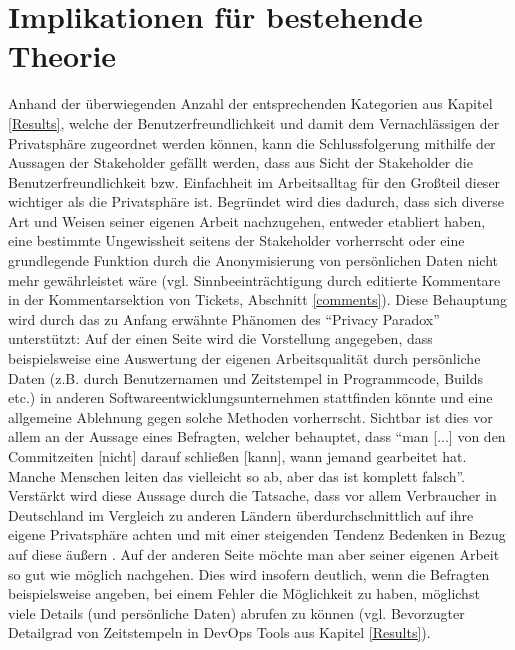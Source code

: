 \section{Implikationen für bestehende Theorie}
Anhand der überwiegenden Anzahl der entsprechenden Kategorien aus Kapitel \ref{Results}, welche der Benutzerfreundlichkeit und damit dem Vernachlässigen der
Privatsphäre zugeordnet werden können, kann die Schlussfolgerung mithilfe der Aussagen der Stakeholder gefällt werden, dass aus Sicht der Stakeholder die Benutzerfreundlichkeit bzw. Einfachheit
im Arbeitsalltag für den Großteil dieser wichtiger als die Privatsphäre ist. \newline Begründet wird dies dadurch, dass sich diverse Art und Weisen seiner eigenen Arbeit nachzugehen, entweder etabliert haben, eine bestimmte Ungewissheit seitens der Stakeholder vorherrscht oder eine grundlegende Funktion durch die Anonymisierung
von persönlichen Daten nicht mehr gewährleistet wäre (vgl. Sinnbeeinträchtigung durch editierte Kommentare in der Kommentarsektion von Tickets, Abschnitt \ref{comments}). \newline
Diese Behauptung wird durch das zu Anfang erwähnte Phänomen des \enquote{Privacy Paradox} unterstützt: Auf der einen Seite wird die Vorstellung angegeben, dass beispielsweise eine Auswertung der eigenen Arbeitsqualität 
durch persönliche Daten (z.B. durch Benutzernamen und Zeitstempel in Programmcode, Builds etc.) in anderen Softwareentwicklungsunternehmen stattfinden könnte und eine allgemeine Ablehnung gegen solche Methoden vorherrscht. Sichtbar ist dies vor allem
an der Aussage eines Befragten, welcher behauptet, dass \enquote{man [...] von den Commitzeiten [nicht] darauf schließen [kann], wann jemand gearbeitet hat. Manche Menschen leiten das vielleicht so ab, aber das ist komplett falsch}. Verstärkt wird diese Aussage durch die Tatsache, dass vor allem Verbraucher in Deutschland im Vergleich zu anderen Ländern überdurchschnittlich auf ihre eigene Privatsphäre achten \cite{IfH:2015aa} und mit einer steigenden Tendenz
Bedenken in Bezug auf diese äußern \cite{Bansal:2016aa}. \newline
Auf der anderen Seite möchte man aber seiner eigenen Arbeit so gut wie möglich nachgehen. Dies wird insofern deutlich, wenn die Befragten beispielsweise angeben, bei einem Fehler die Möglichkeit zu haben, möglichst viele Details (und persönliche Daten) abrufen zu können (vgl. Bevorzugter Detailgrad von Zeitstempeln
in DevOps Tools aus Kapitel \ref{Results}). \newline
